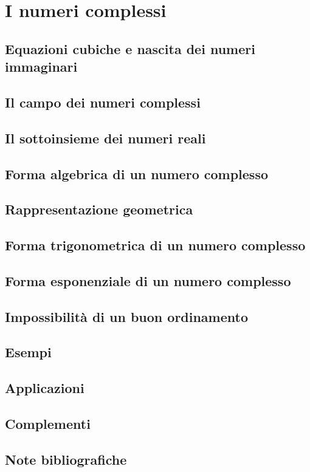\chapter{I numeri complessi}
\section{Equazioni cubiche e nascita dei numeri immaginari}
\section{Il campo dei numeri complessi}
\section{Il sottoinsieme dei numeri reali}
\section{Forma algebrica di un numero complesso}
\section{Rappresentazione geometrica}
\section{Forma trigonometrica di un numero complesso}
\section{Forma esponenziale di un numero complesso}
\section{Impossibilità di un buon ordinamento}
\section{Esempi}
\section{Applicazioni}
\section{Complementi}
\section{Note bibliografiche}